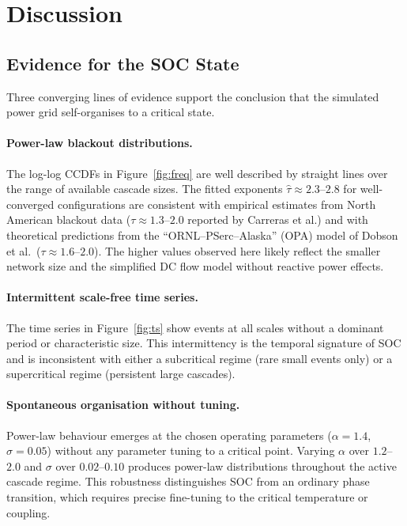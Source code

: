 \documentclass[12pt,a4paper]{article}
\begin{document}
\section{Discussion}
\label{sec:disc}

\subsection{Evidence for the SOC State}

Three converging lines of evidence support the conclusion that the
simulated power grid self-organises to a critical state.

\paragraph{Power-law blackout distributions.}
The log-log CCDFs in Figure~\ref{fig:freq} are well described by
straight lines over the range of available cascade sizes. The fitted
exponents $\hat{\tau} \approx 2.3$--$2.8$ for well-converged
configurations are consistent with empirical estimates from North
American blackout data ($\tau \approx 1.3$--$2.0$ reported by
Carreras et al.) and with theoretical predictions from the
``ORNL--PSerc--Alaska'' (OPA) model of Dobson et al.\
($\tau \approx 1.6$--$2.0$). The higher values observed here likely
reflect the smaller network size and the simplified DC flow model
without reactive power effects.

\paragraph{Intermittent scale-free time series.}
The time series in Figure~\ref{fig:ts} show events at all scales
without a dominant period or characteristic size. This intermittency
is the temporal signature of SOC and is inconsistent with either
a subcritical regime (rare small events only) or a supercritical
regime (persistent large cascades).

\paragraph{Spontaneous organisation without tuning.}
Power-law behaviour emerges at the chosen operating parameters
($\alpha = 1.4$, $\sigma = 0.05$) without any parameter tuning to
a critical point. Varying $\alpha$ over $1.2$--$2.0$ and $\sigma$
over $0.02$--$0.10$ produces power-law distributions throughout
the active cascade regime. This robustness distinguishes SOC from
an ordinary phase transition, which requires precise fine-tuning to
the critical temperature or coupling.
\end{document}
